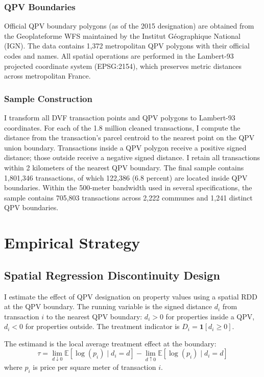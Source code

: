 \documentclass[12pt]{article}
\newcommand{\E}{\mathbb{E}}
\begin{document}
\subsubsection*{QPV Boundaries} Official QPV boundary polygons (as of the 2015 designation) are obtained from the Geoplateforme WFS maintained by the Institut G\'{e}ographique National (IGN). The data contains 1,372 metropolitan QPV polygons with their official codes and names. All spatial operations are performed in the Lambert-93 projected coordinate system (EPSG:2154), which preserves metric distances across metropolitan France.

\subsubsection*{Sample Construction} I transform all DVF transaction points and QPV polygons to Lambert-93 coordinates. For each of the 1.8 million cleaned transactions, I compute the distance from the transaction's parcel centroid to the nearest point on the QPV union boundary. Transactions inside a QPV polygon receive a positive signed distance; those outside receive a negative signed distance. I retain all transactions within 2 kilometers of the nearest QPV boundary. The final sample contains 1,801,346 transactions, of which 122,386 (6.8 percent) are located inside QPV boundaries. Within the 500-meter bandwidth used in several specifications, the sample contains 705,803 transactions across 2,222 communes and 1,241 distinct QPV boundaries.




\section{Empirical Strategy}

\subsection{Spatial Regression Discontinuity Design}

I estimate the effect of QPV designation on property values using a spatial RDD at the QPV boundary. The running variable is the signed distance $d_i$ from transaction $i$ to the nearest QPV boundary: $d_i > 0$ for properties inside a QPV, $d_i < 0$ for properties outside. The treatment indicator is $D_i = \mathbf{1}[d_i \geq 0]$.

The estimand is the local average treatment effect at the boundary:
\begin{equation}
\tau = \lim_{d \downarrow 0} \E[\log(p_i) \mid d_i = d] - \lim_{d \uparrow 0} \E[\log(p_i) \mid d_i = d]
\end{equation}
where $p_i$ is price per square meter of transaction $i$.
\end{document}
